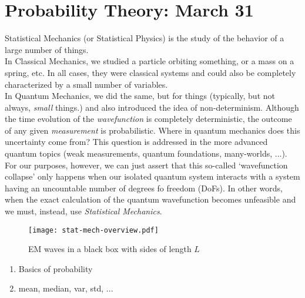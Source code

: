 \section{Probability Theory: March 31}
\label{s:probability}

Statistical Mechanics (or Statistical Physics) is the study of the behavior of a large number of things.
\\

In Classical Mechanics, we studied a particle orbiting something, or a mass on a spring, etc. In all cases, they were classical systems and could also be completely characterized by a small number of variables.
\\

In Quantum Mechanics, we did the same, but for things (typically, but not always, \textit{small} things.) and also introduced the idea of non-determinism. Although the time evolution of the \emph{wavefunction} is completely deterministic, the outcome of any given \emph{measurement} is probabilistic. Where in quantum mechanics does this uncertainty come from? This question is addressed in the more advanced quantum topics (weak measurements, quantum foundations, many-worlds, ...). For our purposes, however, we can just assert that this so-called `wavefunction collapse' only happens when our isolated quantum system interacts with a system having an uncountable number of degrees fo freedom (DoFs). In other words, when the exact calculation of the quantum wavefunction becomes unfeasible and we must, instead, use \emph{Statistical Mechanics}.

\begin{figure}[h]
\centering
\texttt{[image: stat-mech-overview.pdf]}
\caption{EM waves in a black box with sides of length $L$}
\end{figure}


\begin{enumerate}
\item Basics of probability
\item mean, median, var, std, ...
\end{enumerate}
